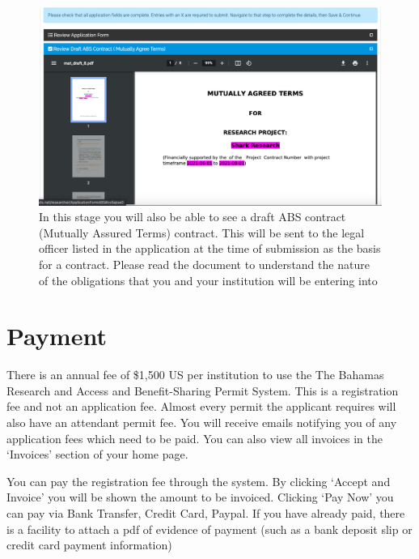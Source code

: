 \documentclass[
]{book}
\begin{document}
\begin{figure}
\centering
\includegraphics{images/review_mat.png}
\caption{In this stage you will also be able to see a draft ABS contract (Mutually Assured Terms) contract. This will be sent to the legal officer listed in the application at the time of submission as the basis for a contract. Please read the document to understand the nature of the obligations that you and your institution will be entering into}
\end{figure}

\hypertarget{payment}{%
\chapter{Payment}\label{payment}}

There is an annual fee of \$1,500 US per institution to use the The Bahamas Research and Access and Benefit-Sharing Permit System. This is a registration fee and not an application fee. Almost every permit the applicant requires will also have an attendant permit fee. You will receive emails notifying you of any application fees which need to be paid. You can also view all invoices in the `Invoices' section of your home page.

You can pay the registration fee through the system. By clicking `Accept and Invoice' you will be shown the amount to be invoiced. Clicking `Pay Now' you can pay via Bank Transfer, Credit Card, Paypal. If you have already paid, there is a facility to attach a pdf of evidence of payment (such as a bank deposit slip or credit card payment information)
\end{document}
